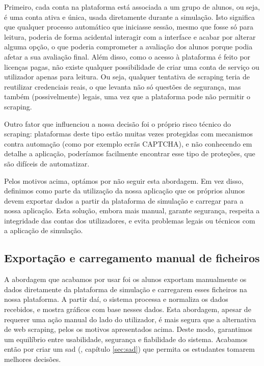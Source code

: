 Primeiro, cada conta na plataforma está associada a um grupo de alunos, ou seja, é uma conta ativa e única, usada diretamente durante a simulação. Isto significa que qualquer processo automático que iniciasse sessão, mesmo que fosse só para leitura, poderia de forma acidental interagir com a interface e acabar por alterar alguma opção, o que poderia comprometer a avaliação dos alunos porque podia afetar a sua avaliação final. Além disso, como o acesso à plataforma é feito por licenças pagas, não existe qualquer possibilidade de criar uma conta de serviço ou utilizador apenas para leitura. Ou seja, qualquer tentativa de scraping teria de reutilizar credenciais reais, o que levanta não só questões de segurança, mas também (possivelmente) legais, uma vez que a plataforma pode não permitir o scraping.

Outro fator que influenciou a nossa decisão foi o próprio risco técnico do scraping: plataformas deste tipo estão muitas vezes protegidas com mecanismos contra automação (como por exemplo ecrãs CAPTCHA), e não conhecendo em detalhe a aplicação, poderíamos facilmente encontrar esse tipo de proteções, que são difíceis de automatizar.

Pelos motivos acima, optámos por não seguir esta abordagem. Em vez disso, definimos como parte da utilização da nossa aplicação que os próprios alunos devem exportar dados a partir da plataforma de simulação e carregar para a nossa aplicação. Esta solução, embora mais manual, garante segurança, respeita a integridade das contas dos utilizadores, e evita problemas legais ou técnicos com a aplicação de simulação.

\subsection{Exportação e carregamento manual de ficheiros}

A abordagem que acabamos por usar foi os alunos exportam manualmente os dados diretamente da plataforma de simulação e carregarem esses ficheiros na nossa plataforma. A partir daí, o sistema processa e normaliza os dados recebidos, e mostra gráficos com base nesses dados. Esta abordagem, apesar de requerer uma ação manual do lado do utilizador, é mais segura que a alternativa de web scraping, pelos os motivos apresentados acima. Deste modo, garantimos um equilíbrio entre usabilidade, segurança e fiabilidade do sistema. Acabamos então por criar um \gls{sad} (\cf, capítulo \ref{sec:sad}) que permita os estudantes tomarem melhores decisões.

